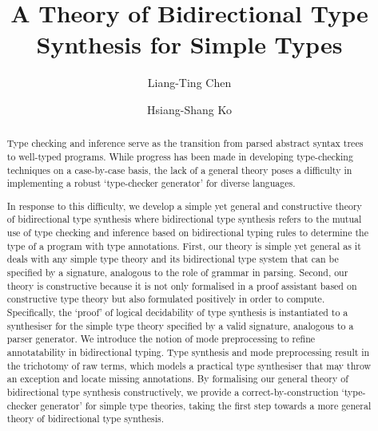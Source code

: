 \documentclass[acmsmall,screen]{acmart}
\theoremstyle{acmdefinition}
\begin{document}
\author{Liang-Ting Chen}
\author{Hsiang-Shang Ko}

\title{A Theory of Bidirectional Type Synthesis for Simple Types}
\begin{abstract}
  Type checking and inference serve as the transition from parsed abstract syntax trees to well-typed programs.
  While progress has been made in developing type-checking techniques on a case-by-case basis, the lack of a general theory poses a difficulty in implementing a robust `type-checker generator' for diverse languages.

  In response to this difficulty, we develop a simple yet general and constructive theory of bidirectional type synthesis where bidirectional type synthesis refers to the mutual use of type checking and inference based on bidirectional typing rules to determine the type of a program with type annotations.
  First, our theory is simple yet general as it deals with any simple type theory and its bidirectional type system that can be specified by a signature, analogous to the role of grammar in parsing.
  Second, our theory is constructive because it is not only formalised in a proof assistant based on constructive type theory but also formulated positively in order to compute.
  Specifically, the `proof' of logical decidability of type synthesis is instantiated to a synthesiser for the simple type theory specified by a valid signature, analogous to a parser generator.
  We introduce the notion of mode preprocessing to refine annotatability in bidirectional typing.
  Type synthesis and mode preprocessing result in the trichotomy of raw terms, which models a practical type synthesiser that may throw an exception and locate missing annotations.
  By formalising our general theory of bidirectional type synthesis constructively, we provide a correct-by-construction `type-checker generator' for simple type theories, taking the first step towards a more general theory of bidirectional type synthesis.
\end{abstract}
\end{document}
